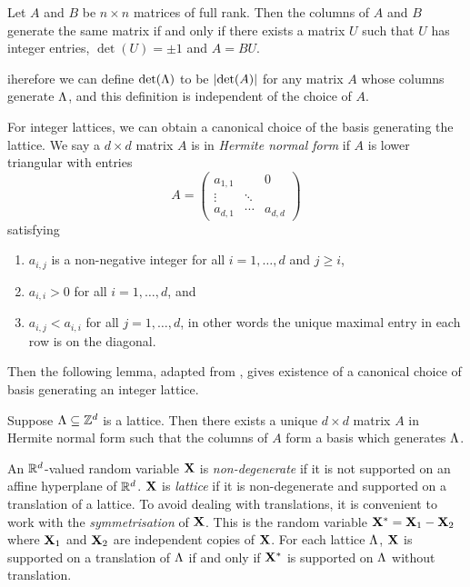 \begin{lemma}
    Let $A$ and $B$ be $n \times n$ matrices of full rank. Then the columns of $A$ and $B$ generate the same matrix if and only if there exists a matrix $U$ such that $U$ has integer entries, $\det(U) = \pm 1$ and $A = BU$.
\end{lemma}
iherefore we can define $\det(\Lambda)$ to be $\lvert\det(A)\rvert$ for any matrix $A$ whose columns generate $\Lambda$, and this definition is independent of the choice of $A$.

For integer lattices, we can obtain a canonical choice of the basis generating the lattice. We say a $d \times d$ matrix $A$ is in \emph{Hermite normal form} if $A$ is lower triangular with entries 
\begin{equation*}
    A = \begin{pmatrix}
        a_{1, 1} &        & 0 \\
        \vdots   & \ddots &   \\
        a_{d, 1} & \cdots & a_{d, d}
    \end{pmatrix}
\end{equation*}
satisfying
\begin{enumerate}
    \item $a_{i, j}$ is a non-negative integer for all $i = 1, \ldots, d$ and $j \geq i$,
    \item $a_{i, i} > 0$ for all $i = 1, \ldots, d$, and
    \item $a_{i, j} < a_{i, i}$ for all $j = 1, \ldots, d$, in other words the unique maximal entry in each row is on the diagonal.
\end{enumerate}

Then the following lemma, adapted from \cite[Corollary 4.3b]{schrijverTheoryLinearInteger1998}, gives existence of a canonical choice of basis generating an integer lattice.
\begin{lemma}
    \label{lem:hnf-basis}
    Suppose $\Lambda \subseteq {\mathbb Z}^d$ is a lattice. Then there exists a unique $d \times d$ matrix $A$ in Hermite normal form such that the columns of $A$ form a basis which generates $\Lambda$.
\end{lemma}

An ${\mathbb R}^d$-valued random variable ${\mathbf X}$ is \emph{non-degenerate} if it is not supported on an affine hyperplane of ${\mathbb R}^d$. ${\mathbf X}$ is \emph{lattice} if it is non-degenerate and supported on a translation of a lattice. To avoid dealing with translations, it is convenient to work with the \emph{symmetrisation} of ${\mathbf X}$. This is the random variable ${\mathbf X}^* = {\mathbf X}_1 - {\mathbf X}_2$ where ${\mathbf X}_1$ and ${\mathbf X}_2$ are independent copies of ${\mathbf X}$. For each lattice $\Lambda$, ${\mathbf X}$ is supported on a translation of $\Lambda$ if and only if ${\mathbf X}^*$ is supported on $\Lambda$ without translation.

